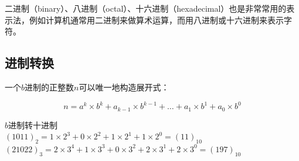 \documentclass[12pt, openany, oneside]{book}
\begin{document}
二进制（binary）、八进制（octal）、十六进制（hexadecimal）也是非常常用的表示法，例如计算机通常用二进制来做算术运算，而用八进制或十六进制来表示字符。

\subsection{进制转换}

一个$ b $进制的正整数$ n $可以唯一地构造展开式：

$$
	n = a^k \times b^k + a_{k-1} \times b^{k-1} + \dots + a_1 \times b^1 + a_0 \times b^0
$$

\begin{tcolorbox}
	$ b $进制转十进制 \\
	$ (1011)_2 = 1 \times 2^3 + 0 \times 2^2 + 1 \times 2^1 + 1 \times 2^0 = (11)_{10} $ \\
	$ (21022)_3 = 2 \times 3^4 + 1 \times 3^3 + 0 \times 3^2 + 2 \times 3^1 + 2 \times 3^0 = (197)_{10} $
\end{tcolorbox}
\end{document}
